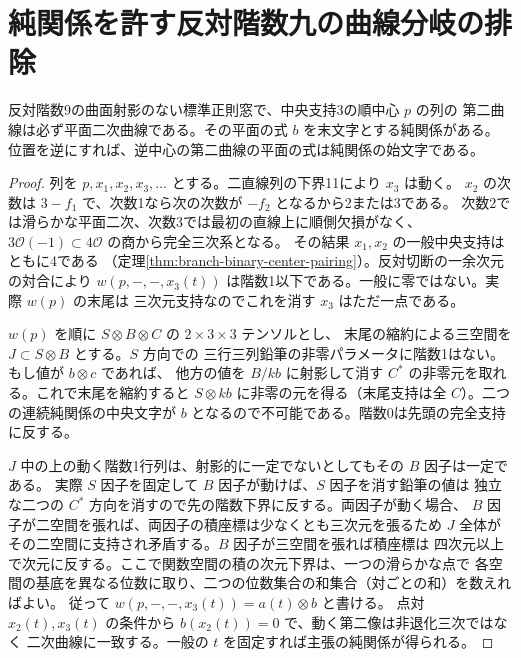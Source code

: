 \section{純関係を許す反対階数九の曲線分岐の排除}
\label{sec:rank-nine-branch-exclusion}
\begin{lemma}\label{lem:rank-nine-ternary-center-conic}
反対階数9の曲面射影のない標準正則窓で、中央支持3の順中心 $p$ の列の
第二曲線は必ず平面二次曲線である。その平面の式 $b$ を末文字とする純関係がある。
位置を逆にすれば、逆中心の第二曲線の平面の式は純関係の始文字である。
\end{lemma}
\begin{proof}
列を $p,x_1,x_2,x_3,\ldots$ とする。二直線列の下界11により $x_3$ は動く。
$x_2$ の次数は $3-f_1$ で、次数1なら次の次数が $-f_2$ となるから2または3である。
次数2では滑らかな平面二次、次数3では最初の直線上に順側欠損がなく、
$3\mathcal O(-1)\subset4\mathcal O$ の商から完全三次系となる。
その結果 $x_1,x_2$ の一般中央支持はともに4である
（定理\ref{thm:branch-binary-center-pairing}）。反対切断の一余次元の対合により
$w(p,-,-,x_3(t))$ は階数1以下である。一般に零ではない。実際 $w(p)$ の末尾は
三次元支持なのでこれを消す $x_3$ はただ一点である。

$w(p)$ を順に $S\otimes B\otimes C$ の $2\times3\times3$ テンソルとし、
末尾の縮約による三空間を $J\subset S\otimes B$ とする。$S$ 方向での
三行三列鉛筆の非零パラメータに階数1はない。もし値が $b\otimes c$ であれば、
他方の値を $B/kb$ に射影して消す $C^*$ の非零元を取れる。これで末尾を縮約すると
$S\otimes kb$ に非零の元を得る（末尾支持は全 $C$）。二つの連続純関係の中央文字が
$b$ となるので不可能である。階数0は先頭の完全支持に反する。

$J$ 中の上の動く階数1行列は、射影的に一定でないとしてもその $B$ 因子は一定である。
実際 $S$ 因子を固定して $B$ 因子が動けば、$S$ 因子を消す鉛筆の値は
独立な二つの $C^*$ 方向を消すので先の階数下界に反する。両因子が動く場合、
$B$ 因子が二空間を張れば、両因子の積座標は少なくとも三次元を張るため
$J$ 全体がその二空間に支持され矛盾する。$B$ 因子が三空間を張れば積座標は
四次元以上で次元に反する。ここで関数空間の積の次元下界は、一つの滑らかな点で
各空間の基底を異なる位数に取り、二つの位数集合の和集合（対ごとの和）を数えればよい。
従って $w(p,-,-,x_3(t))=a(t)\otimes b$ と書ける。
点対 $x_2(t),x_3(t)$ の条件から $b(x_2(t))=0$ で、動く第二像は非退化三次ではなく
二次曲線に一致する。一般の $t$ を固定すれば主張の純関係が得られる。
\end{proof}

